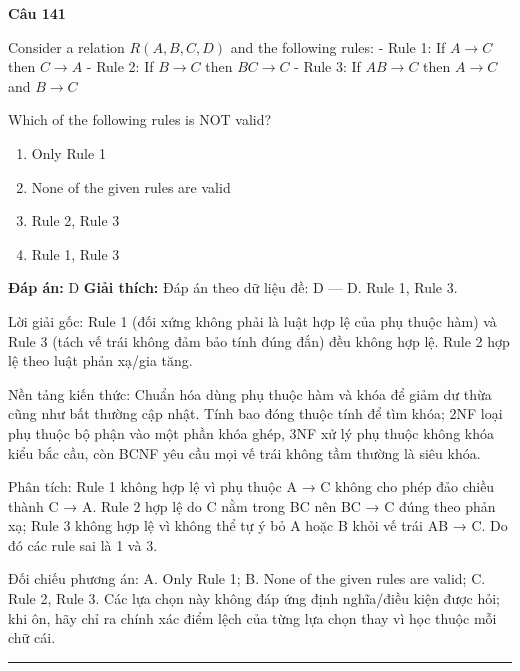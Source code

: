 \documentclass[11pt,a4paper]{article}
\newenvironment{question}[1]{%
  \par\vspace{1em}\noindent\textbf{\large Câu #1}\par\vspace{0.4em}
}{%
  \par\vspace{1em}\hrule\vspace{0.6em}
}
\newenvironment{choices}{%
  \begin{enumerate}[label=\textbf{\Alph*.},leftmargin=2.2em,itemsep=2pt,topsep=3pt]
}{%
  \end{enumerate}
}
\newcommand{\choice}{\item}
\begin{document}
\begin{question}{141}
Consider a relation \(R(A, B, C, D)\) and the following rules:
- Rule 1: If \(A \rightarrow C\) then \(C \rightarrow A\)
- Rule 2: If \(B \rightarrow C\) then \(BC \rightarrow C\)
- Rule 3: If \(AB \rightarrow C\) then \(A \rightarrow C\) and \(B \rightarrow C\)

Which of the following rules is NOT valid?
\begin{choices}
\choice Only Rule 1
\choice None of the given rules are valid
\choice Rule 2, Rule 3
\choice Rule 1, Rule 3
\end{choices}
\textbf{Đáp án:} D
\textbf{Giải thích:} Đáp án theo dữ liệu đề: D — D. Rule 1, Rule 3.

Lời giải gốc: Rule 1 (đối xứng không phải là luật hợp lệ của phụ thuộc hàm) và Rule 3 (tách vế trái không đảm bảo tính đúng đắn) đều không hợp lệ. Rule 2 hợp lệ theo luật phản xạ/gia tăng.

Nền tảng kiến thức: Chuẩn hóa dùng phụ thuộc hàm và khóa để giảm dư thừa cũng như bất thường cập nhật. Tính bao đóng thuộc tính để tìm khóa; 2NF loại phụ thuộc bộ phận vào một phần khóa ghép, 3NF xử lý phụ thuộc không khóa kiểu bắc cầu, còn BCNF yêu cầu mọi vế trái không tầm thường là siêu khóa.

Phân tích: Rule 1 không hợp lệ vì phụ thuộc A → C không cho phép đảo chiều thành C → A. Rule 2 hợp lệ do C nằm trong BC nên BC → C đúng theo phản xạ; Rule 3 không hợp lệ vì không thể tự ý bỏ A hoặc B khỏi vế trái AB → C. Do đó các rule sai là 1 và 3.

Đối chiếu phương án: A. Only Rule 1; B. None of the given rules are valid; C. Rule 2, Rule 3. Các lựa chọn này không đáp ứng định nghĩa/điều kiện được hỏi; khi ôn, hãy chỉ ra chính xác điểm lệch của từng lựa chọn thay vì học thuộc mỗi chữ cái.
\end{question}
\end{document}
